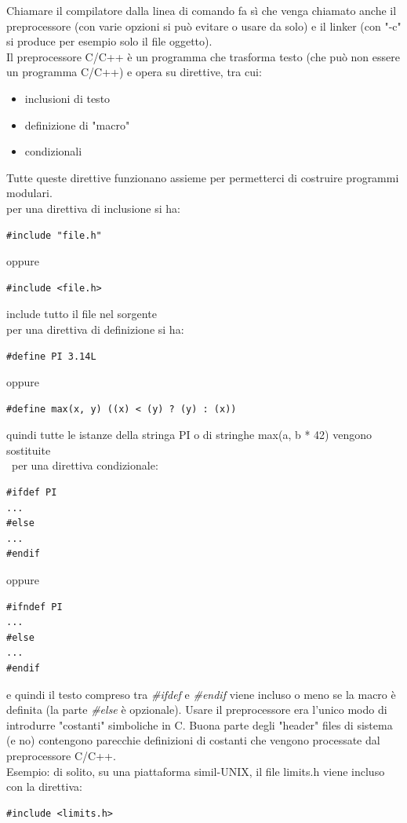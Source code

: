 \documentclass[a4paper,12pt, oneside]{book}
\begin{document}
Chiamare il compilatore dalla linea di comando fa sì
che venga chiamato anche il preprocessore (con varie opzioni si può evitare o usare da solo) e il linker (con "-c" si produce per esempio solo il file oggetto).\\
Il preprocessore C/C++ è un programma che trasforma testo (che può non essere un programma C/C++) e opera su direttive, tra cui:
\begin{itemize}
\item inclusioni di testo
\item definizione di "macro"
\item condizionali
\end{itemize}
Tutte queste direttive funzionano assieme per permetterci di
costruire programmi modulari.\\
per una direttiva di inclusione si ha:
\begin{verbatim}
#include "file.h"
\end{verbatim}
oppure 
\begin{verbatim}
#include <file.h>
\end{verbatim}
include tutto il file nel sorgente\\
per una direttiva di definizione si ha:
\begin{verbatim}
#define PI 3.14L
\end{verbatim}
oppure 
\begin{verbatim}
#define max(x, y) ((x) < (y) ? (y) : (x))
\end{verbatim}
quindi tutte le istanze della stringa PI o di stringhe max(a, b * 42) vengono sostituite\\\
per una direttiva condizionale:
\begin{verbatim}
#ifdef PI
...
#else
...
#endif
\end{verbatim}
oppure 
\begin{verbatim}
#ifndef PI
...
#else
...
#endif
\end{verbatim}
e quindi il testo compreso tra \textit{\#ifdef} e\textit{ \#endif }viene incluso o meno se la
macro è definita (la parte\textit{ \#else} è opzionale).
\newpage
Usare il preprocessore era l'unico modo di introdurre "costanti" simboliche in C. Buona parte degli "header" files di sistema (e no) contengono parecchie
definizioni di costanti che vengono processate dal preprocessore C/C++.
\\
Esempio: di solito, su una piattaforma simil-UNIX, il file limits.h
viene incluso con la direttiva:
\begin{verbatim}
#include <limits.h>
\end{verbatim}
\end{document}
